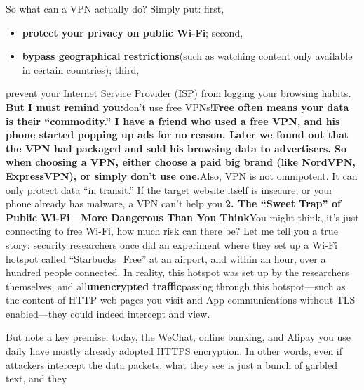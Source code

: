 


So what can a VPN actually do? Simply put: first,

\begin{itemize}
  \item \textbf{protect your privacy on public Wi-Fi}; second,
  \item \textbf{bypass geographical restrictions}(such as watching content only available in certain countries); third,
\end{itemize}

prevent your Internet Service Provider (ISP) from logging your browsing habits\textbf{. But I must remind you:}don't use free VPNs!\textbf{Free often means your data is their “commodity.” I have a friend who used a free VPN, and his phone started popping up ads for no reason. Later we found out that the VPN had packaged and sold his browsing data to advertisers. So when choosing a VPN, either choose a paid big brand (like NordVPN, ExpressVPN), or simply don't use one.}Also, VPN is not omnipotent. It can only protect data “in transit.” If the target website itself is insecure, or your phone already has malware, a VPN can't help you.\textbf{2. The “Sweet Trap” of Public Wi-Fi—More Dangerous Than You Think}You might think, it's just connecting to free Wi-Fi, how much risk can there be? Let me tell you a true story: security researchers once did an experiment where they set up a Wi-Fi hotspot called “Starbucks\_Free” at an airport, and within an hour, over a hundred people connected. In reality, this hotspot was set up by the researchers themselves, and all\textbf{unencrypted traffic}passing through this hotspot—such as the content of HTTP web pages you visit and App communications without TLS enabled—they could indeed intercept and view.

But note a key premise: today, the WeChat, online banking, and Alipay you use daily have mostly already adopted HTTPS encryption. In other words, even if attackers intercept the data packets, what they see is just a bunch of garbled text, and they


